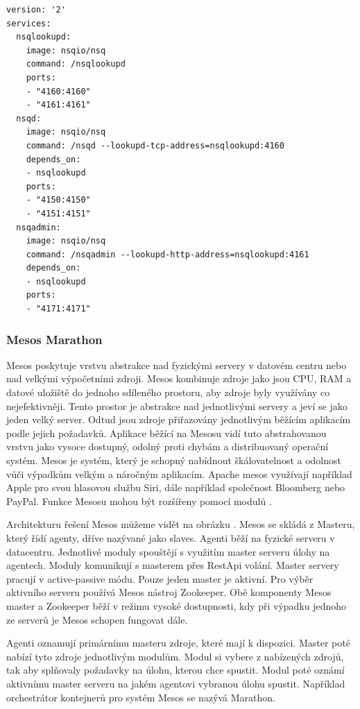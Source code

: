 \begin{lstlisting}[caption={Příklad docker compose souboru},label=lst:compose]
version: '2'
services:
  nsqlookupd:
    image: nsqio/nsq
    command: /nsqlookupd
    ports:
    - "4160:4160"
    - "4161:4161"
  nsqd:
    image: nsqio/nsq
    command: /nsqd --lookupd-tcp-address=nsqlookupd:4160
    depends_on:
    - nsqlookupd
    ports:
    - "4150:4150"
    - "4151:4151"
  nsqadmin:
    image: nsqio/nsq
    command: /nsqadmin --lookupd-http-address=nsqlookupd:4161
    depends_on:
    - nsqlookupd  
    ports:
    - "4171:4171"
\end{lstlisting}

\subsubsection{Mesos Marathon}
Mesos poskytuje vrstvu abstrakce nad fyzickými servery v datovém centru nebo nad velkými výpočetními zdroji. Mesos kombinuje zdroje jako jsou CPU, RAM a datové uložiště do jednoho sdíleného prostoru, aby zdroje byly využívány co nejefektivněji. Tento prostor je abstrakce nad jednotlivými servery a jeví se jako jeden velký server. Odtud jsou zdroje přiřazovány jednotlivým běžícím aplikacím podle jejich požadavků. Aplikace běžící na Mesosu vidí tuto abstrahovanou vrstvu jako vysoce dostupný,  odolný proti chybám a distribuovaný operační systém. Mesos je systém, který je \linebreak schopný nabídnout škálovatelnost a odolnost vůči výpadkům velkým a náročným aplikacím. Apache mesos využívají například Apple pro svou hlasovou službu Siri, dále například společnost Bloomberg nebo PayPal. Funkce Mesosu mohou být rozšířeny pomocí modulů \cite{delvalle}. \par
    Architekturu řešení Mesos můžeme vidět na obrázku \cite{mesos-picture}. Mesos se skládá z Masteru, který řídí agenty, dříve nazývané jako slaves. Agenti běží na fyzické serveru v datacentru. Jednotlivé moduly spouštějí s využitím master serveru úlohy na agentech. Moduly komunikují s masterem přes RestApi volání. Master servery pracují v active-passive módu. Pouze jeden master je aktivní. Pro výběr aktivního serveru používá Mesos nástroj Zookeeper. Obě komponenty Mesos master a Zookeeper běží v režimu vysoké dostupnosti, kdy při výpadku jednoho ze serverů je Mesos schopen fungovat dále. \par
	Agenti oznamují primárnímu masteru zdroje, které mají k dispozici. Master poté nabízí tyto zdroje jednotlivým modulům. Modul si vybere z nabízených zdrojů, tak aby splňovaly požadavky na úlohu, kterou chce spustit. Modul poté oznámí aktivnímu master serveru na jakém agentovi vybranou úlohu spustit. Například orchestrátor kontejnerů pro systém Mesos se nazývá Marathon.\par
